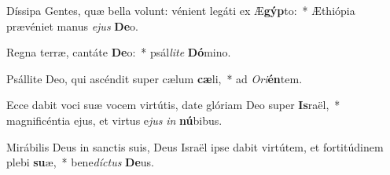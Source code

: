 \item Díssipa Gentes, quæ bella volunt: vénient legáti ex Æ\textbf{gýp}to:~* Æthiópia prævéniet manus \textit{e}\textit{jus} \textbf{De}o.
\item Regna terræ, cantáte \textbf{De}o:~* psál\textit{li}\textit{te} \textbf{Dó}mino.
\item Psállite Deo, qui ascéndit super cælum \textbf{cæ}li,~* ad \textit{O}\textit{ri}\textbf{én}tem.
\item Ecce dabit voci suæ vocem virtútis, date glóriam Deo super \textbf{Is}raël,~* magnificéntia ejus, et virtus e\textit{jus} \textit{in} \textbf{nú}bibus.
\item Mirábilis Deus in sanctis suis, Deus Israël ipse dabit virtútem, et fortitúdinem plebi \textbf{su}æ,~* bene\textit{díc}\textit{tus} \textbf{De}us.
